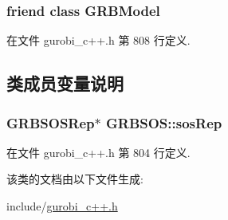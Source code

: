 \subsubsection[{\texorpdfstring{G\+R\+B\+Model}{GRBModel}}]{\setlength{\rightskip}{0pt plus 5cm}friend class {\bf G\+R\+B\+Model}\hspace{0.3cm}{\ttfamily [friend]}}\hypertarget{classGRBSOS_a43690ac42cca6dade14d7fde97306d59}{}\label{classGRBSOS_a43690ac42cca6dade14d7fde97306d59}


在文件 gurobi\+\_\+c++.\+h 第 808 行定义.



\subsection{类成员变量说明}
\subsubsection[{\texorpdfstring{sos\+Rep}{sosRep}}]{\setlength{\rightskip}{0pt plus 5cm}G\+R\+B\+S\+O\+S\+Rep$\ast$ G\+R\+B\+S\+O\+S\+::sos\+Rep\hspace{0.3cm}{\ttfamily [private]}}\hypertarget{classGRBSOS_a322ecee38e16d78a226ed3cdb3227b5b}{}\label{classGRBSOS_a322ecee38e16d78a226ed3cdb3227b5b}


在文件 gurobi\+\_\+c++.\+h 第 804 行定义.



该类的文档由以下文件生成\+:\begin{DoxyCompactItemize}
\item 
include/\hyperlink{gurobi__c_09_09_8h}{gurobi\+\_\+c++.\+h}\end{DoxyCompactItemize}
